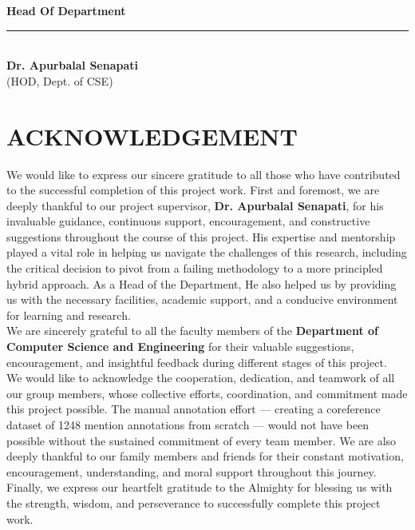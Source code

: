 \documentclass[12pt,a4paper]{report}
\begin{document}
\noindent \textbf{Head Of Department}\\[0.3cm]
\rule{4cm}{0.4pt}\\[0.1cm]
\textbf{Dr. Apurbalal Senapati}\\
(HOD, Dept. of CSE)

\newpage
\chapter*{\fontsize{20}{24}\selectfont ACKNOWLEDGEMENT}

\noindent We would like to express our sincere gratitude to all those who have contributed to the successful completion of this project work. First and foremost, we are deeply thankful to our project supervisor, \textbf{Dr. Apurbalal Senapati}, for his invaluable guidance, continuous support, encouragement, and constructive suggestions throughout the course of this project. His expertise and mentorship played a vital role in helping us navigate the challenges of this research, including the critical decision to pivot from a failing methodology to a more principled hybrid approach. As a Head of the Department, He also helped us by providing us with the necessary facilities, academic support, and a conducive environment for learning and research.\\[0.5cm]

\noindent We are sincerely grateful to all the faculty members of the \textbf{Department of Computer Science and Engineering} for their valuable suggestions, encouragement, and insightful feedback during different stages of this project.\\[0.5cm]

\noindent We would like to acknowledge the cooperation, dedication, and teamwork of all our group members, whose collective efforts, coordination, and commitment made this project possible. The manual annotation effort --- creating a coreference dataset of 1248 mention annotations from scratch --- would not have been possible without the sustained commitment of every team member. We are also deeply thankful to our family members and friends for their constant motivation, encouragement, understanding, and moral support throughout this journey.\\[0.5cm]

\noindent Finally, we express our heartfelt gratitude to the Almighty for blessing us with the strength, wisdom, and perseverance to successfully complete this project work.
\end{document}
